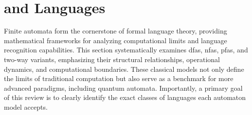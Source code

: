 \section{ and Languages} 
\label{sec:classical-finite-automata} 

Finite automata form the cornerstone of formal language theory, providing mathematical frameworks for analyzing computational limits and language recognition capabilities. This section systematically examines \glspl{dfa}, \glspl{nfa}, \glspl{pfa}, and two-way variants, emphasizing their structural relationships, operational dynamics, and computational boundaries. These classical models not only define the limits of traditional computation but also serve as a benchmark for more advanced paradigms, including quantum automata. Importantly, a primary goal of this review is to clearly identify the exact classes of languages each automaton model accepts.






